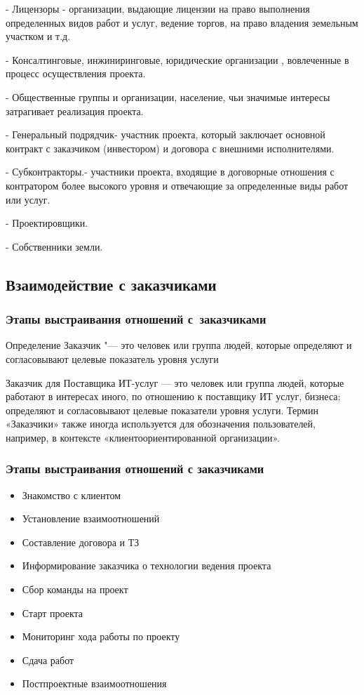 \documentclass{../industrial-development}
\begin{document}
- Лицензоры - организации, выдающие лицензии на право выполнения определенных видов работ и услуг, ведение торгов, на право владения земельным участком и т.д.

- Консалтинговые, инжиниринговые, юридические организации , вовлеченные в процесс осуществления проекта.

- Общественные группы и организации, население, чьи значимые интересы затрагивает реализация проекта.

- Генеральный подрядчик- участник проекта, который заключает основной контракт с заказчиком (инвестором) и договора с внешними исполнителями.

- Субконтракторы.- участники проекта, входящие в договорные отношения с контратором более высокого уровня и отвечающие за определенные виды работ или услуг.

- Проектировщики.

- Собственники земли.

\subsection{Взаимодействие с заказчиками}
\begin{frame} \frametitle{Этапы выстраивания отношений с~заказчиками}
	\begin{block}{Определение}
		\alert{Заказчик} "--- это человек или группа людей, которые определяют и согласовывают целевые показатель уровня услуги
	\end{block}
\end{frame}
	
\lecturenotes
Заказчик для Поставщика ИТ-услуг — это человек или группа людей, которые работают в интересах иного, по отношению к поставщику ИТ услуг, бизнеса; определяют и согласовывают целевые показатели уровня услуги. Термин «Заказчики» также иногда используется для обозначения пользователей, например, в контексте «клиентоориентированной организации».


\begin{frame} \frametitle{Этапы выстраивания отношений с заказчиками}

\begin{itemize}
 \item Знакомство с клиентом
 \item Установление взаимоотношений
 \item Составление договора и ТЗ
 \item Информирование заказчика о технологии ведения проекта
 \item Сбор команды на проект 
 \item Старт проекта 
 \item Мониторинг хода работы по проекту
 \item Сдача работ
 \item Постпроектные взаимоотношения
  \end{itemize}
\end{frame}
\end{document}
